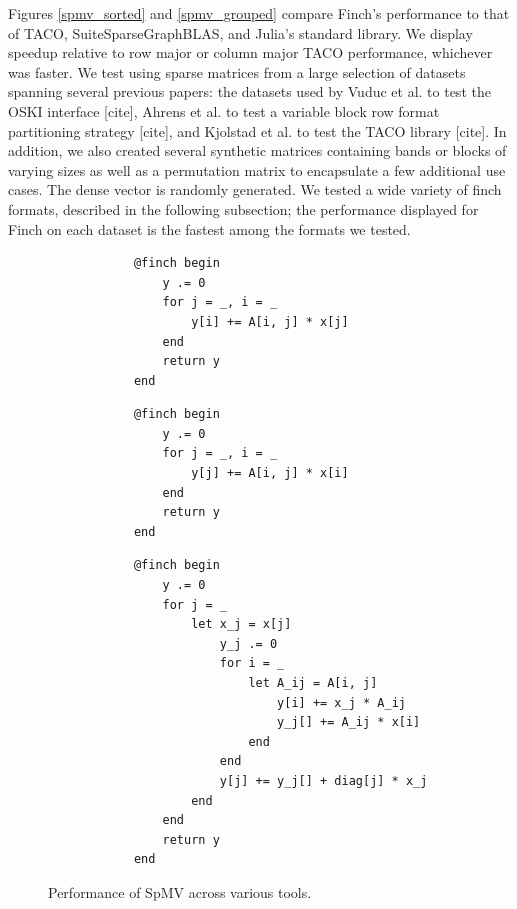  Figures \ref{spmv_sorted} and \ref{spmv_grouped} compare Finch’s performance to that of TACO, SuiteSparseGraphBLAS, and Julia’s standard library. We display speedup relative to row major or column major TACO performance, whichever was faster. We test using sparse matrices from a large selection of datasets spanning several previous papers: the datasets used by Vuduc et al. to test the OSKI interface [cite], Ahrens et al. to test a variable block row format partitioning strategy [cite], and Kjolstad et al. to test the TACO library [cite]. In addition, we also created several synthetic matrices containing bands or blocks of varying sizes as well as a permutation matrix to encapsulate a few additional use cases. The dense vector is randomly generated. We tested a wide variety of finch formats, described in the following subsection; the performance displayed for Finch on each dataset is the fastest among the formats we tested.

\begin{figure}
    \begin{minipage}[t]{0.315\textwidth}
        \vspace{0pt} %
        \begin{verbatim}
            @finch begin
                y .= 0
                for j = _, i = _
                    y[i] += A[i, j] * x[j]
                end
                return y
            end
        \end{verbatim}
    \end{minipage}%
    \begin{minipage}[t]{0.315\textwidth}
        \vspace{0pt} %
        \begin{verbatim}
            @finch begin
                y .= 0
                for j = _, i = _
                    y[j] += A[i, j] * x[i]
                end
                return y
            end
        \end{verbatim}
    \end{minipage}
    \begin{minipage}[t]{0.36\textwidth}
        \vspace{0pt} %
        \begin{verbatim}
            @finch begin
                y .= 0
                for j = _
                    let x_j = x[j]
                        y_j .= 0
                        for i = _
                            let A_ij = A[i, j]
                                y[i] += x_j * A_ij
                                y_j[] += A_ij * x[i]
                            end
                        end
                        y[j] += y_j[] + diag[j] * x_j
                    end
                end
                return y
            end
        \end{verbatim}
    \end{minipage}
    \caption{Performance of SpMV across various tools.}
\end{figure}

